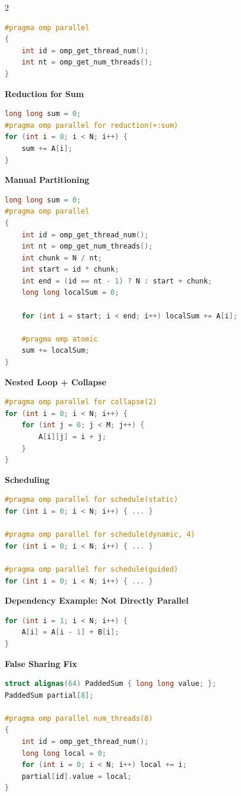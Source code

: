 \documentclass[9pt]{extarticle}
\newcommand{\subhead}[1]{\textbf{#1}\par}
\begin{document}
\begin{multicols}{2}
\begin{lstlisting}[language=C++]
#pragma omp parallel
{
    int id = omp_get_thread_num();
    int nt = omp_get_num_threads();
}
\end{lstlisting}

\subhead{Reduction for Sum}
\begin{lstlisting}[language=C++]
long long sum = 0;
#pragma omp parallel for reduction(+:sum)
for (int i = 0; i < N; i++) {
    sum += A[i];
}
\end{lstlisting}

\subhead{Manual Partitioning}
\begin{lstlisting}[language=C++]
long long sum = 0;
#pragma omp parallel
{
    int id = omp_get_thread_num();
    int nt = omp_get_num_threads();
    int chunk = N / nt;
    int start = id * chunk;
    int end = (id == nt - 1) ? N : start + chunk;
    long long localSum = 0;

    for (int i = start; i < end; i++) localSum += A[i];

    #pragma omp atomic
    sum += localSum;
}
\end{lstlisting}

\subhead{Nested Loop + Collapse}
\begin{lstlisting}[language=C++]
#pragma omp parallel for collapse(2)
for (int i = 0; i < N; i++) {
    for (int j = 0; j < M; j++) {
        A[i][j] = i + j;
    }
}
\end{lstlisting}

\subhead{Scheduling}
\begin{lstlisting}[language=C++]
#pragma omp parallel for schedule(static)
for (int i = 0; i < N; i++) { ... }

#pragma omp parallel for schedule(dynamic, 4)
for (int i = 0; i < N; i++) { ... }

#pragma omp parallel for schedule(guided)
for (int i = 0; i < N; i++) { ... }
\end{lstlisting}

\subhead{Dependency Example: Not Directly Parallel}
\begin{lstlisting}[language=C++]
for (int i = 1; i < N; i++) {
    A[i] = A[i - 1] + B[i];
}
\end{lstlisting}

\subhead{False Sharing Fix}
\begin{lstlisting}[language=C++]
struct alignas(64) PaddedSum { long long value; };
PaddedSum partial[8];

#pragma omp parallel num_threads(8)
{
    int id = omp_get_thread_num();
    long long local = 0;
    for (int i = 0; i < N; i++) local += i;
    partial[id].value = local;
}
\end{lstlisting}


\end{multicols}
\end{document}
